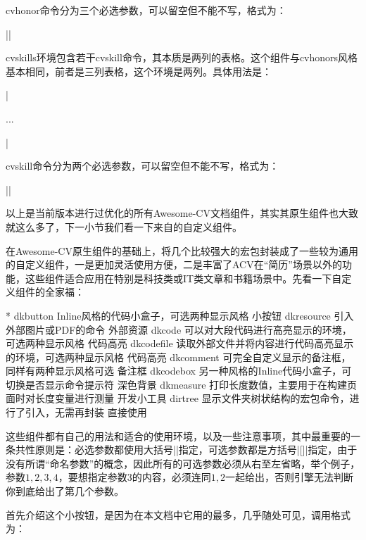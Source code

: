 cvhonor命令分为三个必选参数，可以留空但不能不写，格式为：

||

cvskills环境包含若干cvskill命令，其本质是两列的表格。这个组件与cvhonors风格基本相同，前者是三列表格，这个环境是两列。具体用法是：

|\begin{cvskills}\cvskill...\end{cvskills}|

cvskill命令分为两个必选参数，可以留空但不能不写，格式为：

||

以上是{\dk}当前版本进行过优化的所有Awesome-CV文档组件，其实其原生组件也大致就这么多了，下一小节我们看一下来自{\dk}的自定义组件。

在Awesome-CV原生组件的基础上，{\dk}将几个比较强大的宏包封装成了一些较为通用的自定义组件，一是更加灵活使用方便，二是丰富了ACV在“简历”场景以外的功能，这些组件适合应用在特别是科技类或IT类文章和书籍场景中。先看一下{\dk}自定义组件的全家福：

\begin{cvhonors}*
  \cvhonor
    {dkbutton}
    {Inline风格的代码小盒子，可选两种显示风格}
    {小按钮}
  \cvhonor
    {dkresource}
    {引入外部图片或PDF的命令}
    {外部资源}
  \cvhonor
    {dkcode}
    {可以对大段代码进行高亮显示的环境，可选两种显示风格}
    {代码高亮}
  \cvhonor
    {dkcodefile}
    {读取外部文件并将内容进行代码高亮显示的环境，可选两种显示风格}
    {代码高亮}
  \cvhonor
    {dkcomment}
    {可完全自定义显示的备注框，同样有两种显示风格可选}
    {备注框}
  \cvhonor
    {dkcodebox}
    {另一种风格的Inline代码小盒子，可切换是否显示命令提示符}
    {深色背景}
  \cvhonor
    {dkmeasure}
    {打印长度数值，主要用于在构建页面时对长度变量进行测量}
    {开发小工具}
  \cvhonor
    {dirtree}
    {显示文件夹树状结构的宏包命令，{\dk}进行了引入，无需再封装}
    {直接使用}
\end{cvhonors}

这些组件都有自己的用法和适合的使用环境，以及一些注意事项，其中最重要的一条共性原则是：必选参数都使用大括号|{}|指定，可选参数都是方括号|[]|指定，由于{\LaTeXe}没有所谓“命名参数”的概念，因此所有的可选参数必须从右至左省略，举个例子，参数$1,2,3,4$，要想指定参数$3$的内容，必须连同$1,2$一起给出，否则引擎无法判断你到底给出了第几个参数。

首先介绍这个小按钮，是因为在本文档中它用的最多，几乎随处可见，调用格式为：

